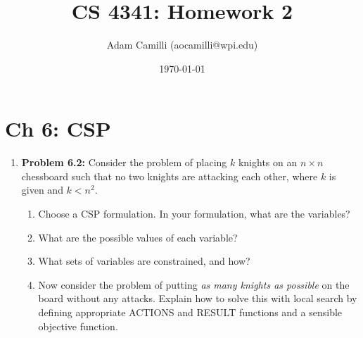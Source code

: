 \documentclass[10pt]{article}
\begin{document}
\title{CS 4341: Homework 2}
\author{Adam Camilli (aocamilli@wpi.edu)}
\date{\today}
\maketitle

\section*{Ch 6: CSP}
\begin{enumerate}
\item \textbf{Problem 6.2:} Consider the problem of placing $k$ knights on an $n \times n$ chessboard such that no two knights are attacking each other, where $k$ is given and $k < n^2$.
  \begin{enumerate}
  \item Choose a CSP formulation. In your formulation, what are the variables?
  \item What are the possible values of each variable?
  \item What sets of variables are constrained, and how?
  \item Now consider the problem of putting \textit{as many knights as possible} on the board without any attacks. Explain how to solve this with local search by defining appropriate ACTIONS and RESULT functions and a sensible objective function.
  \end{enumerate}
  
\end{enumerate}
\end{document}
